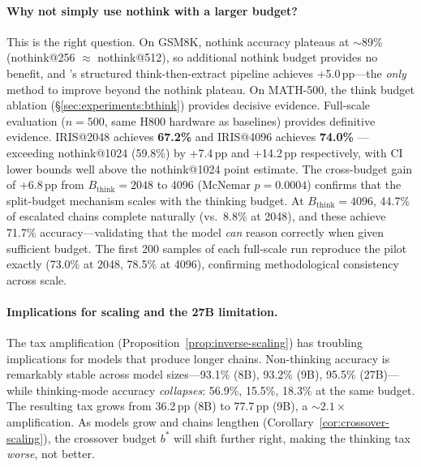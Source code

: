 \paragraph{Why not simply use nothink with a larger budget?}
This is the right question.
On GSM8K, nothink accuracy plateaus at ${\sim}$89\% (nothink@256 $\approx$ nothink@512), so additional nothink budget provides no benefit, and \method{}'s structured think-then-extract pipeline achieves +5.0\,pp---the \emph{only} method to improve beyond the nothink plateau.
On MATH-500, the think budget ablation (\S\ref{sec:experiments:bthink}) provides decisive evidence.
Full-scale evaluation ($n{=}500$, same H800 hardware as baselines) provides definitive evidence.
IRIS@2048 achieves \textbf{67.2\%}  and IRIS@4096 achieves \textbf{74.0\%} ---exceeding nothink@1024 (59.8\%) by +7.4\,pp and +14.2\,pp respectively, with CI lower bounds well above the nothink@1024 point estimate.
The cross-budget gain of +6.8\,pp from $B_{\text{think}}{=}2048$ to 4096 (McNemar $p{=}0.0004$) confirms that the split-budget mechanism scales with the thinking budget.
At $B_{\text{think}}{=}4096$, 44.7\% of escalated chains complete naturally (vs.\ 8.8\% at 2048), and these achieve 71.7\% accuracy---validating that the model \emph{can} reason correctly when given sufficient budget.
The first 200 samples of each full-scale run reproduce the pilot exactly (73.0\% at 2048, 78.5\% at 4096), confirming methodological consistency across scale.

\paragraph{Implications for scaling and the 27B limitation.}
The tax amplification (Proposition~\ref{prop:inverse-scaling}) has troubling implications for models that produce longer chains.
Non-thinking accuracy is remarkably stable across model sizes---93.1\% (8B), 93.2\% (9B), 95.5\% (27B)---while thinking-mode accuracy \emph{collapses}: 56.9\%, 15.5\%, 18.3\% at the same budget.
The resulting tax grows from 36.2\,pp (8B) to 77.7\,pp (9B), a ${\sim}2.1\times$ amplification.
As models grow and chains lengthen (Corollary~\ref{cor:crossover-scaling}), the crossover budget $b^*$ will shift further right, making the thinking tax \emph{worse}, not better.

